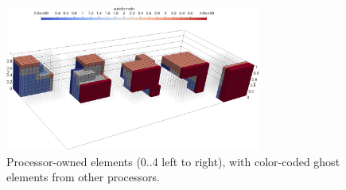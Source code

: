 \begin{figure}[H]
		\begin{center}
			\includegraphics[width=0.75\textwidth]{img/mesh/cube-NONperiodic,ghost.jpg}
			\vspace{-2mm}
		\caption{Processor-owned elements (0..4 left to right), with color-coded ghost elements from other processors.}
		\label{figure:ghost}
		\end{center}
	\end{figure}\vspace{-5mm}